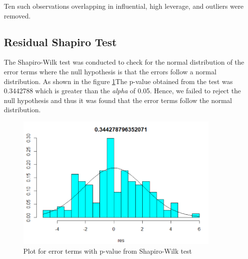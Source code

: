 Ten such observations overlapping in influential, high leverage, and outliers were removed. 

\subsection{Residual Shapiro Test}
\label{sec:residual-shapiro-test}
The Shapiro-Wilk test was conducted to check for the normal distribution of the error terms where the null hypothesis is that the errors follow a normal distribution. As shown in the figure \ref{fig:shapiro}The p-value obtained from the test was 0.3442788 which is greater than the \textit{alpha} of 0.05. Hence, we failed to reject the null hypothesis and thus it was found that the error terms follow the normal distribution. 

\begin{figure}
  \centering
  \includegraphics[width = 0.9\textwidth]{figures/Shapiro.PNG}
  \caption{Plot for error terms with p-value from Shapiro-Wilk test}
  \label{fig:shapiro}
\end{figure}



